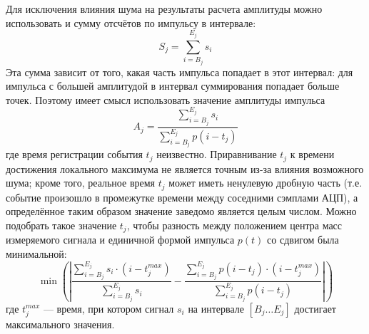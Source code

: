 Для исключения влияния шума на результаты расчета амплитуды можно использовать и сумму отсчётов по импульсу в интервале:
\begin{equation*}
  S_j = \sum \limits_{i = B_j}^{E_j} s_i
\end{equation*}
Эта сумма зависит от того, какая часть импульса попадает в этот интервал: для импульса с большей амплитудой в интервал суммирования попадает больше точек. Поэтому имеет смысл использовать значение амплитуды импульса
\begin{equation*}
  A_j = \frac{ \sum\limits_{i=B_j}^{E_j} s_i }{ \sum\limits_{i=B_j}^{E_j} p( i - t_j ) }
\end{equation*}
где время регистрации события $t_j$ неизвестно. Приравнивание $t_j$ к времени достижения локального максимума не является точным из-за влияния возможного шума; кроме того, реальное время $t_j$ может иметь ненулевую дробную часть (т.е. событие произошло в промежутке времени между соседними сэмплами АЦП), а определённое таким образом значение заведомо является целым числом. Можно подобрать такое значение $t_j$, чтобы разность между положением центра масс измеряемого сигнала и единичной формой импульса $p(t)$ со сдвигом была минимальной:
\begin{equation*}
  \min \left( \left| \frac{ \sum \limits_{i = B_j}^{E_j} s_i \cdot (i - t_j^{max}) }{\sum \limits_{i = B_j}^{E_j} s_i} - 
                     \frac{ \sum \limits_{i = B_j}^{E_j} p( i - t_j ) \cdot (i - t_j^{max}) }{\sum \limits_{i = B_j}^{E_j} p(i - t_j) }   \right| \right) 
\end{equation*}
где $t_j^{max}$ --- время, при котором сигнал $s_i$ на интервале $\left[ B_j \ldots E_j \right] $ достигает максимального значения. 


